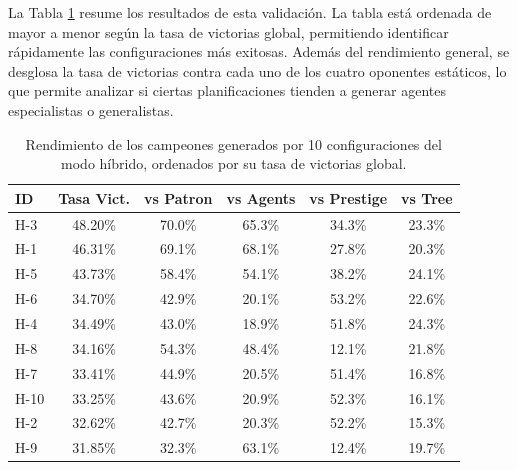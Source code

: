 La Tabla \ref{tab:resultados_hibridos} resume los resultados de esta validación. La tabla está ordenada de mayor a menor según la tasa de victorias global, permitiendo identificar rápidamente las configuraciones más exitosas. Además del rendimiento general, se desglosa la tasa de victorias contra cada uno de los cuatro oponentes estáticos, lo que permite analizar si ciertas planificaciones tienden a generar agentes especialistas o generalistas.

\begin{table}[H]
	\centering
	\caption{Rendimiento de los campeones generados por 10 configuraciones del modo híbrido, ordenados por su tasa de victorias global.}
	\label{tab:resultados_hibridos}
	\begin{tabular}{@{}lccccc@{}}
		\toprule
		\textbf{ID} & \textbf{Tasa Vict.} & \textbf{vs Patron} & \textbf{vs Agents} & \textbf{vs Prestige} & \textbf{vs Tree} \\
		\midrule
		H-3                 & 48.20\%                   & 70.0\%                & 65.3\%                & 34.3\%                  & 23.3\%              \\
		H-1                 & 46.31\%                   & 69.1\%                & 68.1\%                & 27.8\%                  & 20.3\%              \\
		H-5                 & 43.73\%                   & 58.4\%                & 54.1\%                & 38.2\%                  & 24.1\%              \\
		H-6                 & 34.70\%                   & 42.9\%                & 20.1\%                & 53.2\%                  & 22.6\%              \\
		H-4                 & 34.49\%                   & 43.0\%                & 18.9\%                & 51.8\%                  & 24.3\%              \\
		H-8                 & 34.16\%                   & 54.3\%                & 48.4\%                & 12.1\%                  & 21.8\%              \\
		H-7                 & 33.41\%                   & 44.9\%                & 20.5\%                & 51.4\%                  & 16.8\%              \\
		H-10                & 33.25\%                   & 43.6\%                & 20.9\%                & 52.3\%                  & 16.1\%              \\
		H-2                 & 32.62\%                   & 42.7\%                & 20.3\%                & 52.2\%                  & 15.3\%              \\
		H-9                 & 31.85\%                   & 32.3\%                & 63.1\%                & 12.4\%                  & 19.7\%              \\
		\bottomrule
	\end{tabular}
\end{table}

